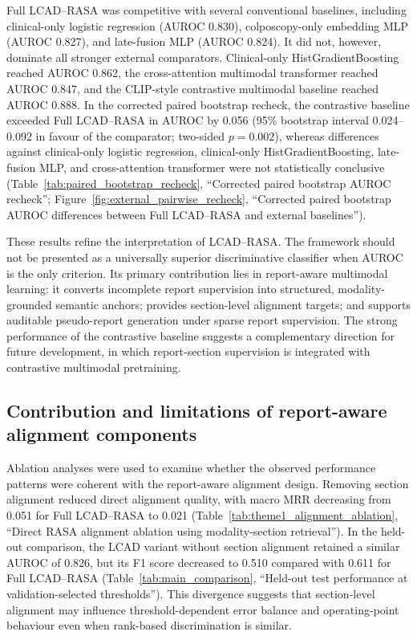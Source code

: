 Full LCAD--RASA was competitive with several conventional baselines, including clinical-only logistic regression (AUROC 0.830), colposcopy-only embedding MLP (AUROC 0.827), and late-fusion MLP (AUROC 0.824). It did not, however, dominate all stronger external comparators. Clinical-only HistGradientBoosting reached AUROC 0.862, the cross-attention multimodal transformer reached AUROC 0.847, and the CLIP-style contrastive multimodal baseline reached AUROC 0.888. In the corrected paired bootstrap recheck, the contrastive baseline exceeded Full LCAD--RASA in AUROC by 0.056 (95\% bootstrap interval 0.024--0.092 in favour of the comparator; two-sided $p=0.002$), whereas differences against clinical-only logistic regression, clinical-only HistGradientBoosting, late-fusion MLP, and cross-attention transformer were not statistically conclusive (Table~\ref{tab:paired_bootstrap_recheck}, ``Corrected paired bootstrap AUROC recheck''; Figure~\ref{fig:external_pairwise_recheck}, ``Corrected paired bootstrap AUROC differences between Full LCAD--RASA and external baselines'').

These results refine the interpretation of LCAD--RASA. The framework should not be presented as a universally superior discriminative classifier when AUROC is the only criterion. Its primary contribution lies in report-aware multimodal learning: it converts incomplete report supervision into structured, modality-grounded semantic anchors; provides section-level alignment targets; and supports auditable pseudo-report generation under sparse report supervision. The strong performance of the contrastive baseline suggests a complementary direction for future development, in which report-section supervision is integrated with contrastive multimodal pretraining.

\subsection{Contribution and limitations of report-aware alignment components}
\label{subsec:ablation_results}

Ablation analyses were used to examine whether the observed performance patterns were coherent with the report-aware alignment design. Removing section alignment reduced direct alignment quality, with macro MRR decreasing from 0.051 for Full LCAD--RASA to 0.021 (Table~\ref{tab:theme1_alignment_ablation}, ``Direct RASA alignment ablation using modality-section retrieval''). In the held-out comparison, the LCAD variant without section alignment retained a similar AUROC of 0.826, but its F1 score decreased to 0.510 compared with 0.611 for Full LCAD--RASA (Table~\ref{tab:main_comparison}, ``Held-out test performance at validation-selected thresholds''). This divergence suggests that section-level alignment may influence threshold-dependent error balance and operating-point behaviour even when rank-based discrimination is similar.

